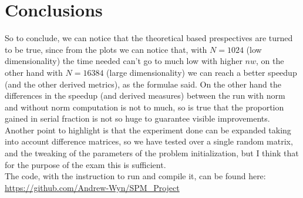 \documentclass[12pt]{extarticle}
\begin{document}
\section{Conclusions}
So to conclude, we can notice that the theoretical based prespectives are turned to be true, since from the plots we can notice that, with $N=1024$ (low dimensionality) the time needed can't go to much low with higher $nw$, on the other hand with $N=16384$ (large dimensionality) we can reach a better speedup (and the other derived metrics), as the formulae said. On the other hand the differences in the speedup (and derived measures) between the run with norm and without norm computation is not to much, so is true that the proportion gained in serial fraction is not so huge to guarantee visible improvements.\\
Another point to highlight is that the experiment done can be expanded taking into account difference matrices, so we have tested over a single random matrix, and the tweaking of the parameters of the problem initialization, but I think that for the purpose of the exam this is sufficient.\\
The code, with the instruction to run and compile it, can be found here:\\ \href{https://github.com/Andrew-Wyn/SPM_Project}{https://github.com/Andrew-Wyn/SPM\_Project}



\end{document}
